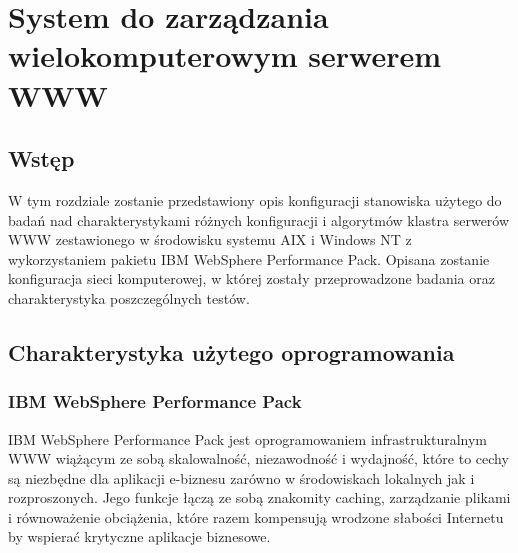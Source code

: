 \chapter{System do zarządzania wielokomputerowym serwerem WWW}
\label{r05}

\section{Wstęp}
W tym rozdziale zostanie przedstawiony opis konfiguracji stanowiska użytego do badań nad charakterystykami 
różnych konfiguracji i algorytmów klastra serwerów WWW zestawionego w środowisku systemu AIX i Windows NT z 
wykorzystaniem pakietu IBM WebSphere Performance Pack. Opisana zostanie konfiguracja sieci komputerowej, w której zostały 
przeprowadzone badania oraz charakterystyka poszczególnych testów.

\section{Charakterystyka użytego oprogramowania}

\subsection{IBM WebSphere Performance Pack}

IBM WebSphere Performance Pack jest oprogramowaniem infrastrukturalnym WWW wiążącym ze sobą skalowalność, niezawodność i 
wydajność, które to cechy są niezbędne dla aplikacji e-biznesu zarówno w środowiskach lokalnych jak i rozproszonych. Jego 
funkcje łączą ze sobą znakomity caching, zarządzanie plikami i równoważenie obciążenia, które razem kompensują wrodzone 
słabości Internetu by wspierać krytyczne aplikacje biznesowe.

